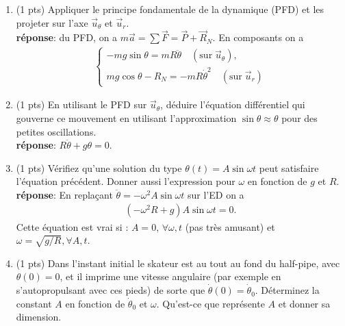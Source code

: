\documentclass[french,10pt]{article}
\begin{document}
\begin{enumerate}
	
	\item (1 pts) Appliquer le principe fondamentale de la dynamique (PFD) et les projeter sur l'axe $\Vec{u}_{\theta}$ et $\Vec{u}_{r}$. \\
	\textbf{réponse}: du PFD, on a $m \vec{a} = \sum \vec{F} = \vec{P} + \vec{R}_N$. En composants on a
	\begin{align*}
		\boxed{
	\begin{cases}
			-mg \sin \theta  = m R \ddot{\theta} \quad (\text{sur} \; \vec{u}_{\theta} ),\\
			 mg \cos \theta - R_N = - m R\dot{\theta}^2 \quad (\text{sur} \; \vec{u}_{r} )
	\end{cases}
	}
	\end{align*}

	\item (1 pts) En utilisant le PFD sur $\Vec{u}_{\theta}$, déduire l'équation différentiel qui gouverne ce mouvement en utilisant l'approximation $\sin \theta \approx \theta$ pour des petites oscillations. \\
	\textbf{réponse}: $\boxed{R \ddot{\theta} + g \theta = 0}$.
	\item (1 pts) Vérifiez qu'une solution du type $\theta(t) = A \sin{\omega t}$ peut satisfaire l'équation précédent. Donner aussi l'expression pour $\omega$ en fonction de $g$ et $R$. \\
	\textbf{réponse}: En replaçant $\ddot{\theta} = -\omega^2 A \sin{\omega t}$ sur l'ED on a	
	\begin{align*}
    (-\omega^2 R + g) A \sin{\omega t}  = 0.
	\end{align*}	
	Cette équation est vrai si : $A = 0$, $\forall \omega, t$ (pas très amusant) et $\boxed{\omega = \sqrt{g/R}}, \forall A, t$.
	\item (1 pts) Dans l'instant initial le skateur est au tout au fond du half-pipe, avec $\theta(0) = 0$, et il imprime une vitesse angulaire (par exemple en s'autopropulsant avec ces pieds) de sorte que $\dot{\theta}(0) = \dot{\theta}_0$. Déterminez la constant $A$ en fonction de $\dot{\theta}_0$ et $\omega$. Qu'est-ce que représente $A$ et donner sa dimension. 
	

\end{enumerate}
\end{document}
